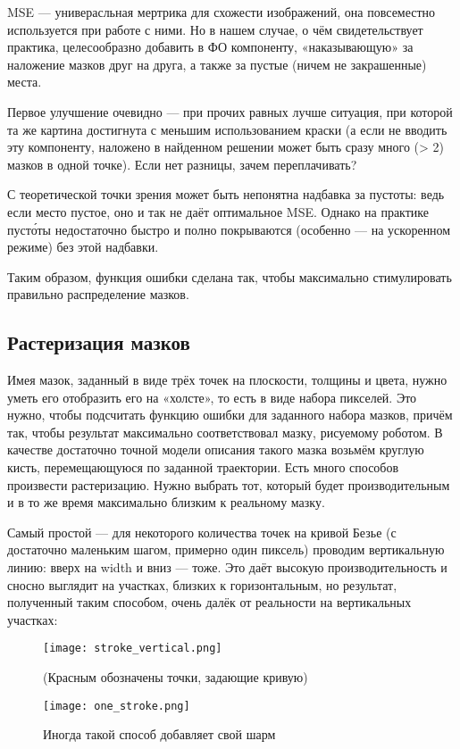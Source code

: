 MSE — универасльная мертрика для схожести изображений, она повсеместно используется при работе с ними.
Но в нашем случае, о чём свидетельствует практика, целесообразно добавить в ФО компоненту, «наказывающую» за наложение мазков друг на друга, а также за пустые (ничем не закрашенные) места.

Первое улучшение очевидно — при прочих равных лучше ситуация, при которой та же картина достигнута с меньшим использованием краски
(а если не вводить эту компоненту, наложено в найденном решении может быть сразу много (> 2) мазков в одной точке).
Если нет разницы, зачем переплачивать?

С теоретической точки зрения может быть непонятна надбавка за пустоты: ведь если место пустое, оно и так не даёт оптимальное MSE.
Однако на практике пусто́ты недостаточно быстро и полно покрываются (особенно — на ускоренном режиме) без этой надбавки.

Таким образом, функция ошибки сделана так, чтобы максимально стимулировать правильно распределение мазков.

\subsection{Растеризация мазков}\label{subsec:rasterization}
Имея мазок, заданный в виде трёх точек на плоскости, толщины и цвета, нужно уметь его отобразить его на «холсте», то есть в виде набора пикселей.
Это нужно, чтобы подсчитать функцию ошибки для заданного набора мазков,
причём так, чтобы результат максимально соответствовал мазку, рисуемому роботом.
В качестве достаточно точной модели описания такого мазка возьмём круглую кисть, перемещающуюся по заданной траектории.
Есть много способов произвести растеризацию.
Нужно выбрать тот, который будет производительным и в то же время максимально близким к реальному мазку.

Самый простой — для некоторого количества точек на кривой Безье (с достаточно маленьким шагом, примерно один пиксель) проводим вертикальную линию: вверх на width и  вниз — тоже.
Это даёт высокую производительность и сносно выглядит на участках, близких к горизонтальным, но результат, полученный таким способом, очень далёк от реальности на вертикальных участках:
\begin{figure}[h!]
    \centering
    \texttt{[image: stroke\_vertical.png]}
    \caption{(Красным обозначены точки, задающие кривую)}
    \label{fig:vertical_stroke}
\end{figure}
\begin{figure}
    \centering
    \texttt{[image: one\_stroke.png]}
    \caption{Иногда такой способ добавляет свой шарм}
    \label{fig:pretty_vert_stroke}
\end{figure}

